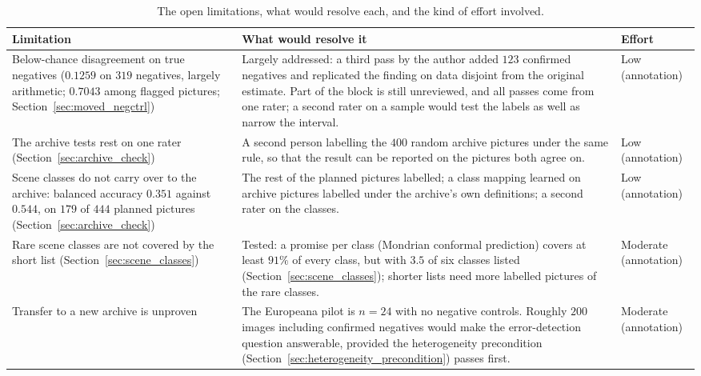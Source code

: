 \documentclass[12pt,a4paper]{report}
\begin{document}
\begin{table}[!htbp]
\centering
\caption[The open limitations and what would resolve them]{The open limitations, what would resolve each, and the kind of effort involved.}
\label{tab:future_work}
\footnotesize
\begin{tabular}{>{\raggedright\arraybackslash}p{3.9cm} >{\raggedright\arraybackslash}p{7.3cm} >{\raggedright\arraybackslash}p{2.2cm}}
\toprule
\textbf{Limitation} & \textbf{What would resolve it} & \textbf{Effort} \\
\midrule

Below-chance disagreement on true negatives ($0.1259$ on $319$ negatives, largely arithmetic; $0.7043$ among flagged pictures; Section~\ref{sec:moved_negctrl}) &
Largely addressed: a third pass by the author added $123$ confirmed negatives and replicated the finding on data disjoint from the original estimate. Part of the block is still unreviewed, and all passes come from one rater; a second rater on a sample would test the labels as well as narrow the interval. &
Low (annotation) \\
\addlinespace
The archive tests rest on one rater (Section~\ref{sec:archive_check}) &
A second person labelling the $400$ random archive pictures under the same rule, so that the result can be reported on the pictures both agree on. &
Low (annotation) \\
\addlinespace
Scene classes do not carry over to the archive: balanced accuracy $0.351$ against $0.544$, on $179$ of $444$ planned pictures (Section~\ref{sec:archive_check}) &
The rest of the planned pictures labelled; a class mapping learned on archive pictures labelled under the archive's own definitions; a second rater on the classes. &
Low (annotation) \\
\addlinespace
Rare scene classes are not covered by the short list (Section~\ref{sec:scene_classes}) &
Tested: a promise per class (Mondrian conformal prediction) covers at least $91\%$ of every class, but with $3.5$ of six classes listed (Section~\ref{sec:scene_classes}); shorter lists need more labelled pictures of the rare classes. &
Moderate (annotation) \\
\addlinespace
Transfer to a new archive is unproven &
The Europeana pilot is $n=24$ with no negative controls. Roughly $200$ images including confirmed negatives would make the error-detection question answerable, provided the heterogeneity precondition (Section~\ref{sec:heterogeneity_precondition}) passes first. &
Moderate (annotation) \\

\end{tabular}
\end{table}
\end{document}
